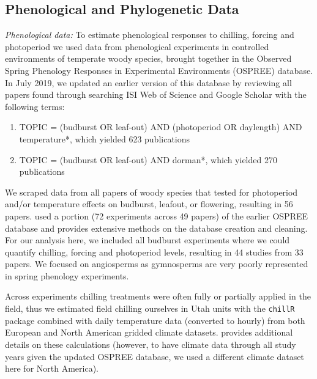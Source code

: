 \documentclass[11pt]{article}
\begin{document}
\subsection*{Phenological and Phylogenetic Data}
\emph{Phenological data:} To estimate phenological responses to chilling, forcing and photoperiod we used data from phenological experiments in controlled environments of temperate woody species, brought together in the Observed Spring Phenology Responses in Experimental Environments (OSPREE) database. In July 2019, we updated an earlier version of this database \citep{wolkovich2019} by reviewing all papers found through searching ISI Web of Science and Google Scholar with the following terms: 
\begin{enumerate}
\item TOPIC = (budburst OR leaf-out) AND (photoperiod OR daylength) AND temperature*, which yielded 623 publications
\item TOPIC = (budburst OR leaf-out) AND dorman*, which yielded 270 publications
\end{enumerate}
We scraped data from all papers of woody species that tested for photoperiod and/or temperature effects on budburst, leafout, or flowering, resulting in 56 papers. \citet{ettinger2020} used a portion (72 experiments across 49 papers) of the earlier OSPREE database and provides extensive methods on the database creation and cleaning. For our analysis here, we included all budburst experiments where we could quantify chilling, forcing and photoperiod levels, resulting in 44 studies from 33 papers. We focused on angiosperms as gymnosperms are very poorly represented in spring phenology experiments. 

Across experiments chilling treatments were often fully or partially applied in the field, thus we estimated field chilling ourselves in Utah units with the \verb|chillR| package combined with daily temperature data (converted to hourly) from both European \citep[E-OBS, version 16, calculating the average of minimum and maximum daily temps,][]{cornes2018} and North American \citep[v3,][]{princetonclimate} gridded climate datasets. \citet{ettinger2020} provides additional details on these calculations (however, to have climate data through all study years given the updated OSPREE database, we used a different climate dataset here for North America).
\end{document}
